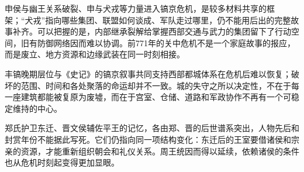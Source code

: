 申侯与幽王关系破裂、申与犬戎等力量进入镐京危机，是较多材料共享的框架；“犬戎”指向哪些集团、联盟如何谈成、军队走过哪里，仍不能用后出的完整故事补齐。可以把握的是，内部继承裂解给掌握西部交通与武力的集团留下了行动空间，旧有防御网络因而难以协调。前771年的关中危机不是一个家庭故事的报应，而是废立、地方资源和边缘武装在同一时刻相接。

丰镐晚期层位与《史记》的镐京叙事共同支持西部都城体系在危机后难以恢复；破坏的范围、时间和各处聚落的命运却并不一致。城的失守之所以决定性，不在于每一座建筑都能被复原为废墟，而在于宫室、仓储、道路和军政协作不再有一个可稳定维持的中心。

郑氏护卫东迁、晋文侯辅佐平王的记忆，各由郑、晋的后世谱系突出，人物先后和封赏年份不能据此写死。它们仍指向同一项结构变化：东迁后的王室要借诸侯和宗亲的资源，才能重新组织朝会和礼仪关系。周王统因而得以延续，依赖诸侯的条件也从危机时刻起变得更加显眼。
